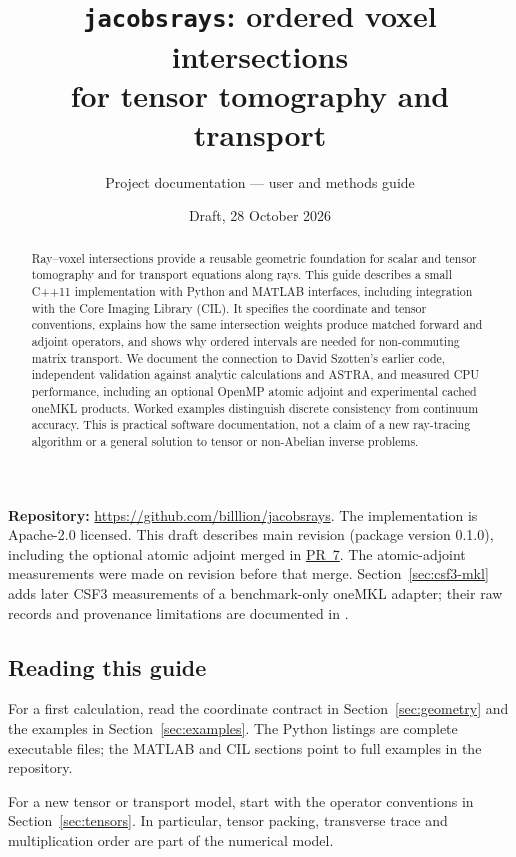 \documentclass[11pt,a4paper]{article}
\title{\texttt{jacobsrays}: ordered voxel intersections\\for tensor tomography and transport}
\author{Project documentation --- user and methods guide}
\date{Draft, 28 October 2026}
\newcommand{\code}[1]{\texttt{\detokenize{#1}}}
\newcommand{\atomiclink}{\href{https://github.com/billlion/jacobsrays/pull/7}{PR~7}}
\begin{document}
\maketitle
\begin{abstract}
Ray--voxel intersections provide a reusable geometric foundation for scalar
and tensor tomography and for transport equations along rays. This guide
describes a small C++11 implementation with Python and MATLAB interfaces,
including integration with the Core Imaging Library (CIL). It specifies the
coordinate and tensor conventions, explains how the same intersection
weights produce matched forward and adjoint operators, and shows why
ordered intervals are needed for non-commuting matrix transport. We document
the connection to David Szotten's earlier code, independent validation
against analytic calculations and ASTRA, and measured CPU performance,
including an optional OpenMP atomic adjoint and experimental cached
oneMKL products. Worked examples distinguish
discrete consistency from continuum accuracy. This is practical software
documentation, not a claim of a new ray-tracing algorithm or a general
solution to tensor or non-Abelian inverse problems.
\end{abstract}

\textbf{Repository:} \url{https://github.com/billlion/jacobsrays}.
The implementation is Apache-2.0 licensed. This draft describes main revision
\href{https://github.com/billlion/jacobsrays/commit/854c6aa60d64be38619be6d268ceb6b7b56da5f7}{\code{854c6aa}}
(package version 0.1.0), including the optional atomic adjoint merged in
\atomiclink. The atomic-adjoint measurements were made on revision
\href{https://github.com/billlion/jacobsrays/commit/f6464f3cb3565c8a2f0021138e96efcd0e7958c0}{\code{f6464f3}} before that merge.
Section~\ref{sec:csf3-mkl} adds later CSF3 measurements of a benchmark-only
oneMKL adapter; their raw records and provenance limitations are documented
in .

\subsection*{Reading this guide}
For a first calculation, read the coordinate contract in
Section~\ref{sec:geometry} and the examples in Section~\ref{sec:examples}.
The Python listings are complete executable files; the MATLAB and CIL
sections point to full examples in the repository.

For a new tensor or transport model, start with the operator conventions
in Section~\ref{sec:tensors}. In particular, tensor packing, transverse
trace and multiplication order are part of the numerical model.
\end{document}

